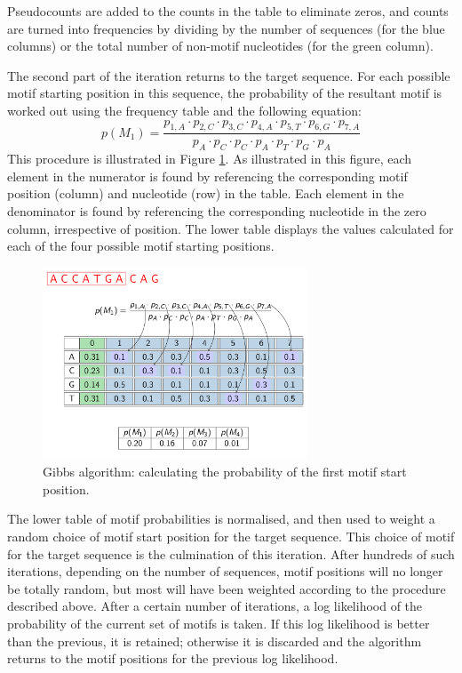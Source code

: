 \documentclass[12pt]{article}
\begin{document}
Pseudocounts are added to the counts in the table to eliminate zeros, and counts are turned into frequencies by dividing by the number of sequences (for the blue columns) or the total number of non-motif nucleotides (for the green column).

The second part of the iteration returns to the target sequence. For each possible motif starting position in this sequence, the probability of the resultant motif is worked out using the frequency table and the following equation: 
\begin{equation}
p(M_{1}) = \frac{p_{1,A} \cdot p_{2,C} \cdot p_{3,C} \cdot p_{4,A} \cdot p_{5,T} \cdot p_{6,G} \cdot p_{7,A}}{p_{A} \cdot p_{C} \cdot p_{C} \cdot p_{A} \cdot p_{T} \cdot p_{G} \cdot p_{A}}
\end{equation}
This procedure is illustrated in Figure \ref{gibbs2}. As illustrated in this figure, each element in the numerator is found by referencing the corresponding motif position (column) and nucleotide (row) in the table. Each element in the denominator is found by referencing the corresponding nucleotide in the zero column, irrespective of position. The lower table displays the values calculated for each of the four possible motif starting positions.  

\begin{figure}[!htbp]
\centering
\includegraphics[width=0.7\textwidth]{GibbsTable1.png}
\caption{Gibbs algorithm: calculating the probability of the first motif start position.}\label{gibbs2}
\end{figure}

The lower table of motif probabilities is normalised, and then used to weight a random choice of motif start position for the target sequence. This choice of motif for the target sequence is the culmination of this iteration. After hundreds of such iterations, depending on the number of sequences, motif positions will no longer be totally random, but most will have been weighted according to the procedure described above. After a certain number of iterations, a log likelihood of the probability of the current set of motifs is taken. If this log likelihood is better than the previous, it is retained; otherwise it is discarded and the algorithm returns to the motif positions for the previous log likelihood.
\end{document}
